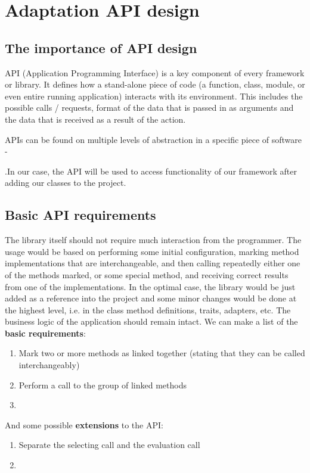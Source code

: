 \chapter{Adaptation API design}

\section{The importance of API design}

API (Application Programming Interface) is a key component of every framework or library. It defines how a stand-alone piece of code (a function, class, module, or even entire running application) interacts with its environment. This includes the possible calls / requests, format of the data that is passed in as arguments and the data that is received as a result of the action.

APIs can be found on multiple levels of abstraction in a specific piece of software - %

.In our case, the API will be used to access functionality of our framework after adding our classes to the project.

\section{Basic API requirements}

The library itself should not require much interaction from the programmer. The usage would be based on performing some initial configuration, marking method implementations that are interchangeable, and then calling repeatedly either one of the methods marked, or some special method, and receiving correct results from one of the implementations.
In the optimal case, the library would be just added as a reference into the project and some minor changes would be done at the highest level, i.e. in the class method definitions, traits, adapters, etc. The business logic of the application should remain intact.
We can make a list of the \textbf{basic requirements}:
\begin{enumerate}
	\item Mark two or more methods as linked together (stating that they can be called interchangeably)
	\item Perform a call to the group of linked methods
	\item %
\end{enumerate}

And some possible \textbf{extensions} to the API:
\begin{enumerate}
	\item Separate the selecting call and the evaluation call
	\item %
\end{enumerate}

